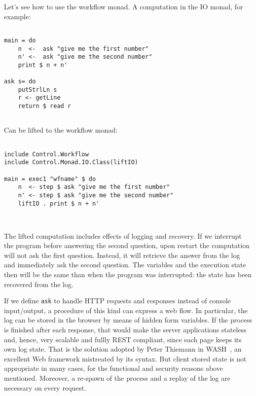 \documentclass{tmr}
\begin{document}
Let's see how to use the workflow monad. A computation in the IO monad, for example: 
 
{\tt 
 
\begin{verbatim} 
 
main = do 
    n  <-  ask "give me the first number" 
    n' <-  ask "give me the second number" 
    print $ n + n' 
 
ask s= do 
    putStrlLn s 
    r <- getLine 
    return $ read r 
 
\end{verbatim} 
 
} 
 
Can be lifted to the workflow monad: 
 
{\tt 
 
\begin{verbatim} 
 
include Control.Workflow 
include Control.Monad.IO.Class(liftIO) 
 
main = exec1 "wfname" $ do 
    n  <- step $ ask "give me the first number" 
    n' <- step $ ask "give me the second number" 
    liftIO . print $ n + n' 
 
 
\end{verbatim} 
 
} 
 
The lifted computation includes effects of logging and recovery. If we interrupt the program before answering the second question, upon restart the computation will not ask the first question. Instead, it will retrieve the answer from the log and immediately ask the second question. The variables and the execution state then will be the same than when the program was interrupted: the state has been recovered from the log. 
 
If we define {\tt ask} to handle HTTP requests and responses instead of console input/output, a procedure of this kind can express a web flow. 
In particular, the log can be stored in the browser by means of hidden form 
variables. If the process is finished after each response, that would make the server applications stateless and, hence, very scalable and fullly REST compliant, since each page keeps its own log state. That is the solution adopted by Peter Thiemann in WASH~\cite{auth:wash}, an excellent Web framework mistreated by its syntax. But client stored state is not appropriate in many cases, for the functional and security reasons above mentioned. Moreover, a re-spawn of the process and a replay of the log are necessary on every request. 
 
\end{document}
